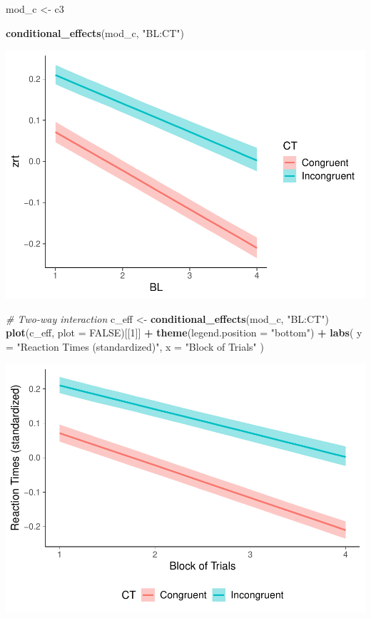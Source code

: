 \documentclass[
]{article}
\newenvironment{Shaded}{\begin{snugshade}}{\end{snugshade}}
\newcommand{\AttributeTok}[1]{\textcolor[rgb]{0.13,0.29,0.53}{#1}}
\newcommand{\CommentTok}[1]{\textcolor[rgb]{0.56,0.35,0.01}{\textit{#1}}}
\newcommand{\ConstantTok}[1]{\textcolor[rgb]{0.56,0.35,0.01}{#1}}
\newcommand{\DecValTok}[1]{\textcolor[rgb]{0.00,0.00,0.81}{#1}}
\newcommand{\FunctionTok}[1]{\textcolor[rgb]{0.13,0.29,0.53}{\textbf{#1}}}
\newcommand{\NormalTok}[1]{#1}
\newcommand{\OtherTok}[1]{\textcolor[rgb]{0.56,0.35,0.01}{#1}}
\newcommand{\SpecialCharTok}[1]{\textcolor[rgb]{0.81,0.36,0.00}{\textbf{#1}}}
\newcommand{\StringTok}[1]{\textcolor[rgb]{0.31,0.60,0.02}{#1}}
\begin{document}
\begin{Shaded}
\begin{Highlighting}[]
\NormalTok{mod\_c }\OtherTok{\textless{}{-}}\NormalTok{ c3}

\FunctionTok{conditional\_effects}\NormalTok{(mod\_c, }\StringTok{"BL:CT"}\NormalTok{)}
\end{Highlighting}
\end{Shaded}

\includegraphics{20_variational_inference_files/figure-latex/Control Model with block as numeric-1.pdf}

\begin{Shaded}
\begin{Highlighting}[]
\CommentTok{\# Two{-}way interaction}
\NormalTok{c\_eff }\OtherTok{\textless{}{-}} \FunctionTok{conditional\_effects}\NormalTok{(mod\_c, }\StringTok{"BL:CT"}\NormalTok{) }
\FunctionTok{plot}\NormalTok{(c\_eff, }\AttributeTok{plot =} \ConstantTok{FALSE}\NormalTok{)[[}\DecValTok{1}\NormalTok{]] }\SpecialCharTok{+}
  \FunctionTok{theme}\NormalTok{(}\AttributeTok{legend.position =} \StringTok{"bottom"}\NormalTok{) }\SpecialCharTok{+}
  \FunctionTok{labs}\NormalTok{(}
    \AttributeTok{y =} \StringTok{"Reaction Times (standardized)"}\NormalTok{,}
    \AttributeTok{x =} \StringTok{"Block of Trials"}
\NormalTok{  )}
\end{Highlighting}
\end{Shaded}

\includegraphics{20_variational_inference_files/figure-latex/Control Model with block as numeric-2.pdf}
\end{document}
